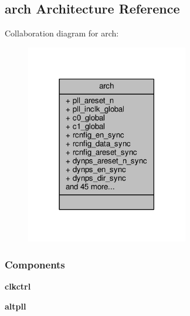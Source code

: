 \subsection{arch Architecture Reference}
\label{classtx__pll__top_1_1arch}


Collaboration diagram for arch\+:\nopagebreak
\begin{figure}[H]
\begin{center}
\leavevmode
\includegraphics[width=201pt]{d1/d49/classtx__pll__top_1_1arch__coll__graph}
\end{center}
\end{figure}
\subsubsection*{Components}
 \begin{DoxyCompactItemize}
\item 
{\bf clkctrl}  {\bfseries }  
\item 
{\bf altpll}  {\bfseries }  
\end{DoxyCompactItemize}
